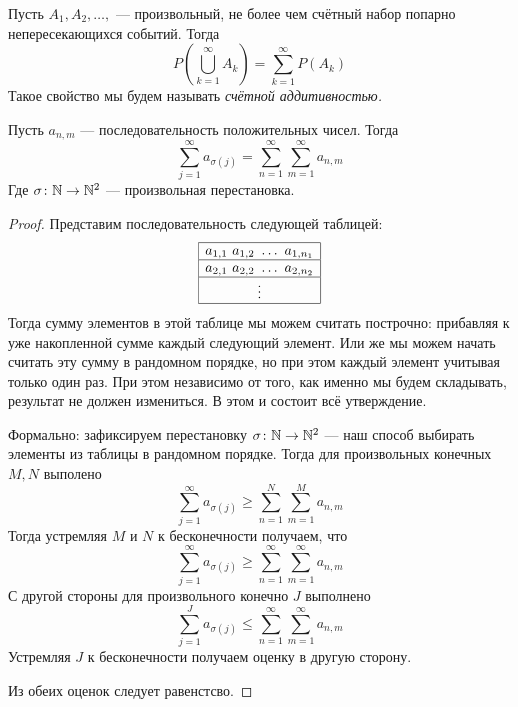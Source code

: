 \begin{definition}
    Пусть $A_1, A_{2}, \ldots, $ --- произвольный, не более чем счётный набор попарно непересекающихся событий. Тогда
    \[
        P\left( \bigcup\limits_{k = 1}^{\infty}A_k \right) = \sum\limits_{k = 1}^{\infty} P(A_k)
    \]
    Такое свойство мы будем называть \it{счётной аддитивностью}.
\end{definition}
\begin{lemma}
    \label{lemma_1.1}
    Пусть $a_{n, m}$ --- последовательность положительных чисел. Тогда
    \[
        \sum\limits_{j = 1}^{\infty} a_{\sigma(j)} =
        \sum\limits_{n = 1}^{\infty}\sum\limits_{m = 1}^{\infty}
        a_{n, m}
    \]
    Где $\sigma \colon \mathbb{N} \to \mathbb{N}^2$ --- произвольная перестановка.
\end{lemma}
\begin{proof}
    Представим последовательность следующей таблицей:
    \[
        \begin{array}{|c|}
            \hline
            a_{1, 1}~ a_{1, 2}~ \ldots~ a_{1, n_1} \\
            \hline
            a_{2, 1}~ a_{2, 2}~ \ldots~ a_{2, n_2} \\
            \hline
            \vdots                                 \\
            \hline
        \end{array}
    \]
    Тогда сумму элементов в этой таблице мы можем считать построчно: прибавляя к уже накопленной сумме
    каждый следующий элемент. Или же мы можем начать считать эту сумму в рандомном порядке, но при этом
    каждый элемент учитывая только один раз. При этом независимо от того, как именно мы будем складывать,
    результат не должен измениться. В этом и состоит всё утверждение.

    Формально: зафиксируем перестановку $\sigma \colon \mathbb{N} \to \mathbb{N}^2$ --- наш способ выбирать элементы
    из таблицы в рандомном порядке. Тогда для произвольных конечных $M, N$ выполено
    \[
        \sum\limits_{j = 1}^{\infty} a_{\sigma(j)} \geq
        \sum\limits_{n = 1}^{N}\sum\limits_{m = 1}^{M} a_{n, m}
    \]
    Тогда устремляя $M$ и $N$ к бесконечности получаем, что
    \[
        \sum\limits_{j = 1}^{\infty} a_{\sigma(j)} \geq
        \sum\limits_{n = 1}^{\infty}\sum\limits_{m = 1}^{\infty}
        a_{n, m}
    \]
    С другой стороны для произвольного конечно $J$ выполнено
    \[
        \sum\limits_{j = 1}^{J} a_{\sigma(j)} \leq
        \sum\limits_{n = 1}^{\infty}\sum\limits_{m = 1}^{\infty} a_{n, m}
    \]
    Устремляя $J$ к бесконечности получаем оценку в другую сторону.

    Из обеих оценок следует равенстсво.
\end{proof}
